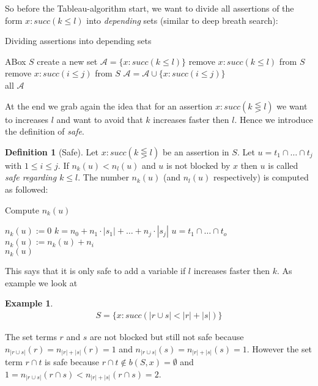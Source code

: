 \documentclass[a4paper,11pt]{scrartcl}
\theoremstyle{break}
\theoremstyle{definition}
\newtheorem{mydef}{Definition}
\newtheorem{ex}{Example}
\begin{document}
So before the Tableau-algorithm start, we want to divide all assertions of the form $x:succ(k\leq l)$ into \textit{depending} sets (similar to deep breath search):
\begin{algorithm}[H] \caption{Dividing assertions into depending sets}
\begin{algorithmic}[l]
\State ABox $S$
\State create a new set $\mathcal{A}=\{x:succ(k\leq l)\}$
\State remove $x:succ(k\leq l)$ from $S$
\State remove $x:succ(i\leq j)$ from $S$
\State $\mathcal{A}=\mathcal{A}\cup\{x:succ(i\leq j)\}$
\EndIf
\EndFor
\EndFor
\EndFor\\
\Return all $\mathcal{A}$
\end{algorithmic}
\end{algorithm}
At the end we grab again the idea that for an assertion $x:succ(k\lesseqgtr l)$ we want to increases $l$ and want to avoid that $k$ increases faster then $l$. Hence we introduce the definition of \textit{safe}.
\begin{mydef}[Safe]
Let $x:succ(k\lesseqgtr l)$ be an assertion in $S$. Let $u=t_1\cap\dots \cap t_j$ with $1\leq i\leq j$. If $n_k(u)<n_l(u)$ and $u$ is not blocked by $x$ then $u$ is called \textit{safe regarding $k\leq l$}. The number $n_k(u)$ (and $n_l(u)$ respectively) is computed as followed:
\begin{algorithm}[H] \caption{Compute $n_k(u)$}
\begin{algorithmic}[l]
\State $n_k(u):=0$
\State $k=n_0+n_1\cdot|s_1|+\dots+n_j\cdot|s_j|$
\State $u=t_1\cap \dots \cap t_o$
\State $n_k(u):=n_k(u)+n_i$
\EndIf
\EndFor\\
\Return $n_k(u)$
\end{algorithmic}
\end{algorithm}
\end{mydef}
This says that it is only safe to add a variable if $l$ increases faster then $k$.
As example we look at 
\begin{ex}
\begin{align*}
S=\{x:succ(|r\cup s|<|r|+|s|)\}
\end{align*}
\end{ex}
The set terms $r$ and $s$ are not blocked but still not safe because $n_{|r\cup s|}(r)=n_{|r|+|s|}(r)=1$ and $n_{|r\cup s|}(s)=n_{|r|+|s|}(s)=1$. However the set term $r\cap t$ is safe because $r\cap t\notin b(S,x)=\emptyset$ and $1=n_{|r\cup s|}(r\cap s)<n_{|r|+|s|}(r\cap s)=2$.
\end{document}
